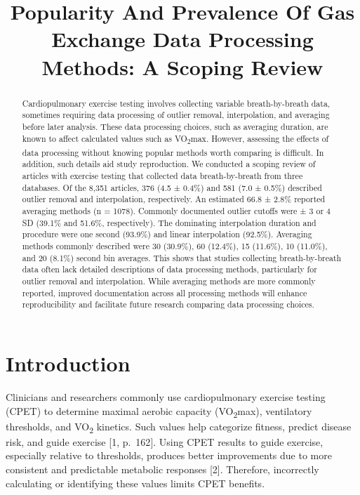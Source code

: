 \documentclass[
  letterpaper,
  DIV=11,
  numbers=noendperiod]{scrartcl}
\title{Popularity And Prevalence Of Gas Exchange Data Processing
Methods: A Scoping Review}
\author{}
\date{}
\begin{document}
\maketitle
\begin{abstract}
Cardiopulmonary exercise testing involves collecting variable
breath-by-breath data, sometimes requiring data processing of outlier
removal, interpolation, and averaging before later analysis. These data
processing choices, such as averaging duration, are known to affect
calculated values such as VO\textsubscript{2}max. However, assessing the
effects of data processing without knowing popular methods worth
comparing is difficult. In addition, such details aid study
reproduction. We conducted a scoping review of articles with exercise
testing that collected data breath-by-breath from three databases. Of
the 8,351 articles, 376 (4.5 ± 0.4\%) and 581 (7.0 ± 0.5\%) described
outlier removal and interpolation, respectively. An estimated 66.8 ±
2.8\% reported averaging methods (n = 1078). Commonly documented outlier
cutoffs were ± 3 or 4 SD (39.1\% and 51.6\%, respectively). The
dominating interpolation duration and procedure were one second (93.9\%)
and linear interpolation (92.5\%). Averaging methods commonly described
were 30 (30.9\%), 60 (12.4\%), 15 (11.6\%), 10 (11.0\%), and 20 (8.1\%)
second bin averages. This shows that studies collecting breath-by-breath
data often lack detailed descriptions of data processing methods,
particularly for outlier removal and interpolation. While averaging
methods are more commonly reported, improved documentation across all
processing methods will enhance reproducibility and facilitate future
research comparing data processing choices.
\end{abstract}

\section{Introduction}\label{introduction}

Clinicians and researchers commonly use cardiopulmonary exercise testing
(CPET) to determine maximal aerobic capacity (VO\textsubscript{2}max),
ventilatory thresholds, and VO\textsubscript{2} kinetics. Such values
help categorize fitness, predict disease risk, and guide exercise {[}1,
p.~162{]}. Using CPET results to guide exercise, especially relative to
thresholds, produces better improvements due to more consistent and
predictable metabolic responses {[}2{]}. Therefore, incorrectly
calculating or identifying these values limits CPET benefits.
\end{document}
